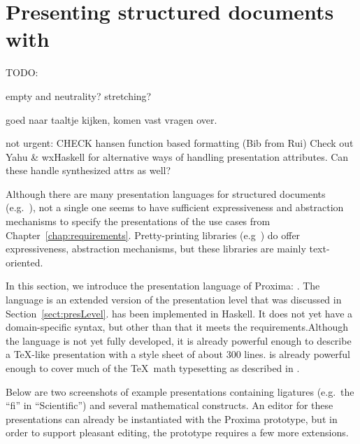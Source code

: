 \chapter{Presenting structured documents with {\Xprez}} \label{chap:presenting}



\bc
TODO:

empty and neutrality? stretching?

goed naar taaltje kijken, komen vast vragen over.

not urgent:
CHECK hansen function based formatting (Bib from Rui)
Check out  Yahu & wxHaskell for alternative ways of handling presentation attributes. Can these handle synthesized attrs as well?
\ec










Although there are many presentation languages for structured documents (e.g.~\cite{css2, badros99ccss, marden98psl, xsl10, quint97thot}), not a single one seems to have sufficient expressiveness and abstraction mechanisms to specify the presentations of the use cases from Chapter~\ref{chap:requirements}. Pretty-printing libraries (e.g~\cite{oppen80prettyPrinting, swierstra98combinators, hughes1995prettyPrinting, kahl99galleyCombs, brand96generationOfFormatters}) do offer expressiveness, abstraction mechanisms, but these libraries are mainly text-oriented. 

In this section, we introduce the presentation language of Proxima: {\Xprez}. The language is an extended version of the presentation level that was discussed in Section~\ref{sect:presLevel}. {\Xprez}  has been implemented in Haskell. \bc It does not yet have a domain-specific syntax, but other than that it meets the requirements.\ec Although the language is not yet fully developed, it \bc is already powerful enough to describe a \TeX -like presentation with a style sheet of about 300 lines. \ec
 is already powerful enough to cover much of the \TeX~math typesetting as described in \cite{heckmann97functionalTex}. 
 
Below are two screenshots of example {\Xprez} presentations containing ligatures (e.g.\ the ``fi'' in ``Scientific'') and several mathematical constructs. An editor for these presentations can already be instantiated with the Proxima prototype, but in order to support pleasant editing, the prototype requires a few more extensions.


